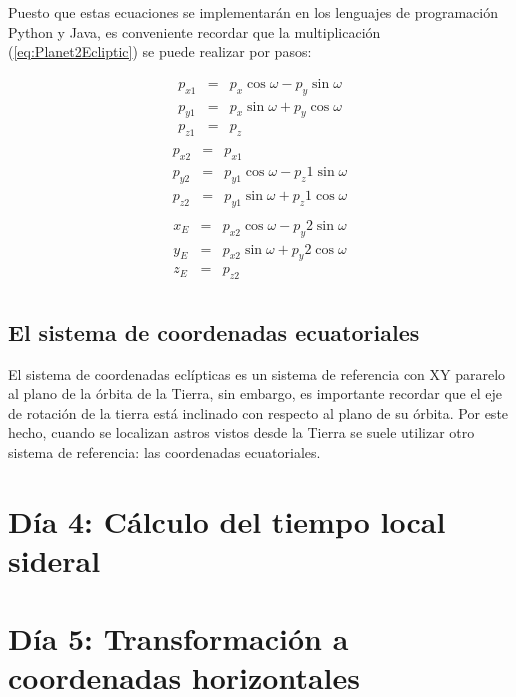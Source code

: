 \documentclass[a4paper,10pt]{article}
\begin{document}
Puesto que estas ecuaciones se implementarán en los lenguajes de programación Python y Java, es conveniente recordar que la multiplicación (\ref{eq:Planet2Ecliptic}) se puede realizar por pasos:

\begin{eqnarray*}
  p_{x1} &=& p_x \cos\omega - p_y\sin\omega\\
  p_{y1} &=& p_x \sin\omega + p_y\cos\omega\\
  p_{z1} &=& p_z\\
\end{eqnarray*}
\begin{eqnarray*}
  p_{x2} &=& p_{x1}\\
  p_{y2} &=& p_{y1} \cos\omega - {p_z1}\sin\omega\\
  p_{z2} &=& p_{y1} \sin\omega + {p_z1}\cos\omega\\
\end{eqnarray*}
\begin{eqnarray*}
  x_E &=& p_{x2} \cos\omega - {p_y2}\sin\omega\\
  y_E &=& p_{x2} \sin\omega + {p_y2}\cos\omega\\
  z_E &=& p_{z2}\\
\end{eqnarray*}

\subsection{El sistema de coordenadas ecuatoriales}
El sistema de coordenadas eclípticas es un sistema de referencia con XY pararelo al plano de la órbita de la Tierra, sin embargo, es importante recordar que el eje de rotación de la tierra está inclinado con respecto al plano de su órbita. Por este hecho, cuando se localizan astros vistos desde la Tierra se suele utilizar otro sistema de referencia: las coordenadas ecuatoriales. 

\section{Día 4: Cálculo del tiempo local sideral}

\section{Día 5: Transformación a coordenadas horizontales}
\end{document}
